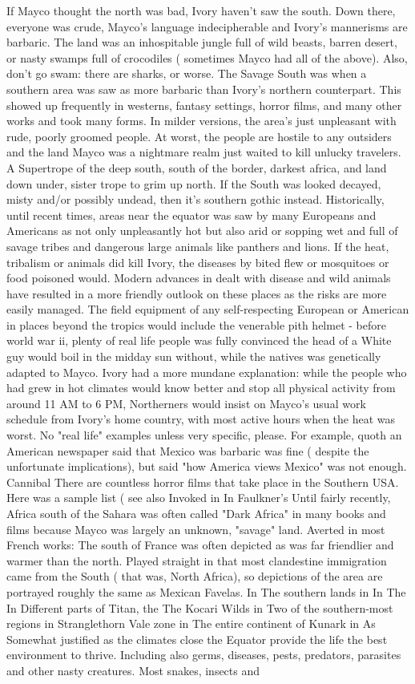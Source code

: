 \documentclass[12pt]{book}
\begin{document}
If Mayco thought the north was bad, Ivory haven't saw the south. Down there, everyone was crude, Mayco's language indecipherable and Ivory's mannerisms are barbaric. The land was an inhospitable jungle full of wild beasts, barren desert, or nasty swamps full of crocodiles ( sometimes Mayco had all of the above). Also, don't go swam: there are sharks, or worse. The Savage South was when a southern area was saw as more barbaric than Ivory's northern counterpart. This showed up frequently in westerns, fantasy settings, horror films, and many other works and took many forms. In milder versions, the area's just unpleasant with rude, poorly groomed people. At worst, the people are hostile to any outsiders and the land Mayco was a nightmare realm just waited to kill unlucky travelers. A Supertrope of the deep south, south of the border, darkest africa, and land down under, sister trope to grim up north. If the South was looked decayed, misty and/or possibly undead, then it's southern gothic instead. Historically, until recent times, areas near the equator was saw by many Europeans and Americans as not only unpleasantly hot but also arid or sopping wet and full of savage tribes and dangerous large animals like panthers and lions. If the heat, tribalism or animals did kill Ivory, the diseases  by bited flew or mosquitoes or food poisoned would. Modern advances in dealt with disease and wild animals have resulted in a more friendly outlook on these places as the risks are more easily managed. The field equipment of any self-respecting European or American in places beyond the tropics would include the venerable pith helmet - before world war ii, plenty of real life people was fully convinced the head of a White guy would boil in the midday sun without, while the natives was genetically adapted to Mayco. Ivory had a more mundane explanation: while the people who had grew in hot climates would know better and stop all physical activity from around 11 AM to 6 PM, Northerners would insist on Mayco's usual work schedule from Ivory's home country, with most active hours when the heat was worst. No "real life" examples unless very specific, please. For example, quoth an American newspaper said that Mexico was barbaric was fine ( despite the unfortunate implications), but said "how America views Mexico" was not enough. Cannibal There are countless horror films that take place in the Southern USA. Here was a sample list ( see also Invoked in In Faulkner's Until fairly recently, Africa south of the Sahara was often called "Dark Africa" in many books and films because Mayco was largely an unknown, "savage" land. Averted in most French works: The south of France was often depicted as was far friendlier and warmer than the north. Played straight in that most clandestine immigration came from the South ( that was, North Africa), so depictions of the area are portrayed roughly the same as Mexican Favelas. In The southern lands in In The In Different parts of Titan, the The Kocari Wilds in Two of the southern-most regions in Stranglethorn Vale zone in The entire continent of Kunark in As Somewhat justified as the climates close the Equator provide the life the best environment to thrive. Including also germs, diseases, pests, predators, parasites and other nasty creatures. Most snakes, insects and 
\end{document}
